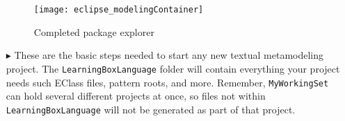 \begin{itemize}
\vspace{0.5cm}

\begin{figure}[htbp]
	\centering
  \texttt{[image: eclipse\_modelingContainer]}
	\caption{Completed package explorer}
	\label{fig:all_files}
\end{figure} 

\vspace{0.5cm}

\item[$\blacktriangleright$] These are the basic steps needed to start any new textual metamodeling project. The \texttt{LearningBoxLanguage} folder will contain everything
your project needs such EClass files, pattern roots, and more. Remember, \texttt{MyWorkingSet} can hold several different projects at once, so files not within
\texttt{LearningBoxLanguage} will not be generated as part of that project.


\end{itemize}
